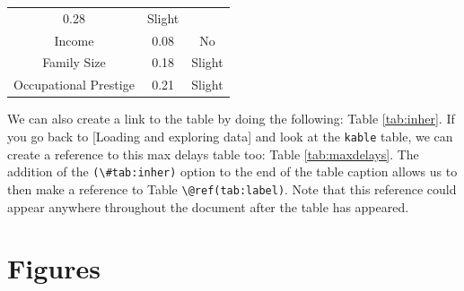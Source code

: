 \documentclass [11pt, proquest] {uwthesis}[2015/03/03]
\begin{document}
\begin{longtable}[]{@{}ccc@{}}
\begin{minipage}[t]{0.47\columnwidth}
0.28\strut
\end{minipage} & \begin{minipage}[t]{0.16\columnwidth}\centering\strut
Slight\strut
\end{minipage}\tabularnewline
\begin{minipage}[t]{0.29\columnwidth}\centering\strut
Income\strut
\end{minipage} & \begin{minipage}[t]{0.47\columnwidth}\centering\strut
0.08\strut
\end{minipage} & \begin{minipage}[t]{0.16\columnwidth}\centering\strut
No\strut
\end{minipage}\tabularnewline
\begin{minipage}[t]{0.29\columnwidth}\centering\strut
Family Size\strut
\end{minipage} & \begin{minipage}[t]{0.47\columnwidth}\centering\strut
0.18\strut
\end{minipage} & \begin{minipage}[t]{0.16\columnwidth}\centering\strut
Slight\strut
\end{minipage}\tabularnewline
\begin{minipage}[t]{0.29\columnwidth}\centering\strut
Occupational Prestige\strut
\end{minipage} & \begin{minipage}[t]{0.47\columnwidth}\centering\strut
0.21\strut
\end{minipage} & \begin{minipage}[t]{0.16\columnwidth}\centering\strut
Slight\strut
\end{minipage}\tabularnewline
\bottomrule
\end{longtable}
We can also create a link to the table by doing the following: Table
\ref{tab:inher}. If you go back to {[}Loading and exploring data{]} and
look at the \texttt{kable} table, we can create a reference to this max
delays table too: Table \ref{tab:maxdelays}. The addition of the
\texttt{(\textbackslash{}\#tab:inher)} option to the end of the table
caption allows us to then make a reference to Table
\texttt{\textbackslash{}@ref(tab:label)}. Note that this reference could
appear anywhere throughout the document after the table has appeared.

\clearpage

\section{Figures}\label{figures-2}
\end{document}

